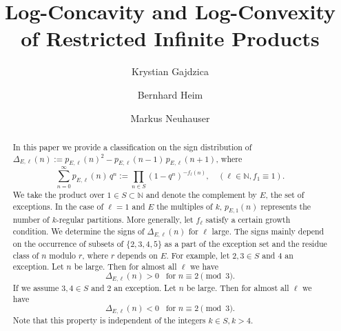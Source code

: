 \documentclass[12pt]{amsart}
\theoremstyle{definition}
\theoremstyle{remark}
\numberwithin{theorem}{section} \numberwithin{equation}{section}
\begin{document}
\title[Infinite Products]{Log-Concavity and Log-Convexity of Restricted Infinite Products}
\author{Krystian Gajdzica}
\address{Theoretical Computer Science Department, Faculty of Mathematics and Computer Science, Jagiellonian University, Łojasiewicza 6, 30--348 Kraków, Poland}
\author{Bernhard Heim}
\address{Department of Mathematics and Computer Science\\Division of Mathematics\\University of Cologne\\ Weyertal 86--90 \\ 50931 Cologne \\Germany}
\author{Markus Neuhauser}
\address{Kutaisi International University, 5/7, Youth Avenue,  Kutaisi, 4600 Georgia}
\address{Lehrstuhl f\"{u}r Geometrie und Analysis, RWTH Aachen University, 52056 Aachen, Germany}
\begin{abstract}In this paper we provide a  classification 
on the sign distribution of $\Delta _{E,\ell}(n):=
p_{E,\ell }(n)^2 - p_{E,\ell }(n-1) \, p_{E,\ell }(n+1)$, where
\begin{equation*}
\sum_{n =0}^{\infty}
p_{E,\ell }(n) \, q^n := \prod_{n \in S}
 \left(1 - q^n \right)^{-f_{\ell}(n)},\quad (\ell \in \mathbb{N}, f_1\equiv 1).
\end{equation*}
We take the product over $1\in
S \subset \mathbb{N}$ and denote the complement by
$E$, the set of exceptions. In the case of $\ell=1$ and $E$
the multiples of $k$, $p_{E,1}\left( n\right) $ represents the number of $k$-regular partitions. More generally, let $f_{\ell}$ satisfy a certain growth condition. We determine the signs of $\Delta _{E,\ell }(n)$ for $\ell$ large. The signs
mainly depend on
the occurrence
of subsets of $\{2,3,4,5\}$ as a part of the exception set and the residue class of $n$ modulo $
r$, where $r
$ depends on $E$. For example, let $2,3 \in S$ and 
$4$ an exception. Let $n$ be large. Then
for almost all $\ell$ we have
\begin{equation*}
\Delta _{E,\ell }(n) >0 \,\,\, \text{ for } n\equiv 2 \pmod{3}.
\end{equation*}
If we assume $3,4 \in S$ and $2$ an  exception.
Let $n$ be large. 
Then
for almost all $\ell$ we have
\begin{equation*}
\Delta _{E,\ell }(n) < 0 \,\,\, \text{ for } n\equiv 2 \pmod{3}.
\end{equation*}
Note that this property is independent of the integers
$k\in S,k>4$.
\end{abstract}
\end{document}
